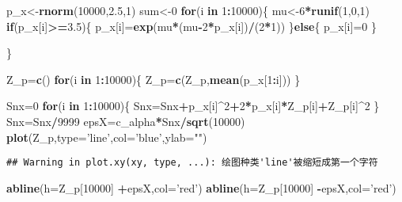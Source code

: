 \documentclass[]{article}
\newenvironment{Shaded}{\begin{snugshade}}{\end{snugshade}}
\newcommand{\KeywordTok}[1]{\textcolor[rgb]{0.13,0.29,0.53}{\textbf{#1}}}
\newcommand{\DataTypeTok}[1]{\textcolor[rgb]{0.13,0.29,0.53}{#1}}
\newcommand{\DecValTok}[1]{\textcolor[rgb]{0.00,0.00,0.81}{#1}}
\newcommand{\FloatTok}[1]{\textcolor[rgb]{0.00,0.00,0.81}{#1}}
\newcommand{\StringTok}[1]{\textcolor[rgb]{0.31,0.60,0.02}{#1}}
\newcommand{\ControlFlowTok}[1]{\textcolor[rgb]{0.13,0.29,0.53}{\textbf{#1}}}
\newcommand{\OperatorTok}[1]{\textcolor[rgb]{0.81,0.36,0.00}{\textbf{#1}}}
\newcommand{\NormalTok}[1]{#1}
\begin{document}
\begin{Shaded}
\begin{Highlighting}[]
\NormalTok{p_x<-}\KeywordTok{rnorm}\NormalTok{(}\DecValTok{10000}\NormalTok{,}\FloatTok{2.5}\NormalTok{,}\DecValTok{1}\NormalTok{)}
\NormalTok{sum<-}\DecValTok{0}
\ControlFlowTok{for}\NormalTok{(i }\ControlFlowTok{in} \DecValTok{1}\OperatorTok{:}\DecValTok{10000}\NormalTok{)\{}
\NormalTok{  mu<-}\DecValTok{6}\OperatorTok{*}\KeywordTok{runif}\NormalTok{(}\DecValTok{1}\NormalTok{,}\DecValTok{0}\NormalTok{,}\DecValTok{1}\NormalTok{)}
  \ControlFlowTok{if}\NormalTok{(p_x[i]}\OperatorTok{>=}\FloatTok{3.5}\NormalTok{)\{}
\NormalTok{  p_x[i]=}\KeywordTok{exp}\NormalTok{(mu}\OperatorTok{*}\NormalTok{(mu}\OperatorTok{-}\DecValTok{2}\OperatorTok{*}\NormalTok{p_x[i])}\OperatorTok{/}\NormalTok{(}\DecValTok{2}\OperatorTok{*}\DecValTok{1}\NormalTok{))}
\NormalTok{  \}}\ControlFlowTok{else}\NormalTok{\{}
\NormalTok{    p_x[i]=}\DecValTok{0}
\NormalTok{  \}}

\NormalTok{\}}

\NormalTok{Z_p=}\KeywordTok{c}\NormalTok{()}
\ControlFlowTok{for}\NormalTok{(i }\ControlFlowTok{in} \DecValTok{1}\OperatorTok{:}\DecValTok{10000}\NormalTok{)\{}
\NormalTok{  Z_p=}\KeywordTok{c}\NormalTok{(Z_p,}\KeywordTok{mean}\NormalTok{(p_x[}\DecValTok{1}\OperatorTok{:}\NormalTok{i]))}
\NormalTok{\}}

\NormalTok{Snx=}\DecValTok{0}  
\ControlFlowTok{for}\NormalTok{(i }\ControlFlowTok{in} \DecValTok{1}\OperatorTok{:}\DecValTok{10000}\NormalTok{)\{}
\NormalTok{  Snx=Snx}\OperatorTok{+}\NormalTok{p_x[i]}\OperatorTok{^}\DecValTok{2}\OperatorTok{+}\DecValTok{2}\OperatorTok{*}\NormalTok{p_x[i]}\OperatorTok{*}\NormalTok{Z_p[i]}\OperatorTok{+}\NormalTok{Z_p[i]}\OperatorTok{^}\DecValTok{2}
\NormalTok{\}}
\NormalTok{Snx=Snx}\OperatorTok{/}\DecValTok{9999}
\NormalTok{epsX=c_alpha}\OperatorTok{*}\NormalTok{Snx}\OperatorTok{/}\KeywordTok{sqrt}\NormalTok{(}\DecValTok{10000}\NormalTok{)}
\KeywordTok{plot}\NormalTok{(Z_p,}\DataTypeTok{type=}\StringTok{'line'}\NormalTok{,}\DataTypeTok{col=}\StringTok{'blue'}\NormalTok{,}\DataTypeTok{ylab=}\StringTok{""}\NormalTok{)}
\end{Highlighting}
\end{Shaded}

\begin{verbatim}
## Warning in plot.xy(xy, type, ...): 绘图种类'line'被缩短成第一个字符
\end{verbatim}

\begin{Shaded}
\begin{Highlighting}[]
\KeywordTok{abline}\NormalTok{(}\DataTypeTok{h=}\NormalTok{Z_p[}\DecValTok{10000}\NormalTok{] }\OperatorTok{+}\NormalTok{epsX,}\DataTypeTok{col=}\StringTok{'red'}\NormalTok{)}
\KeywordTok{abline}\NormalTok{(}\DataTypeTok{h=}\NormalTok{Z_p[}\DecValTok{10000}\NormalTok{] }\OperatorTok{-}\NormalTok{epsX,}\DataTypeTok{col=}\StringTok{'red'}\NormalTok{)}
\end{Highlighting}
\end{Shaded}
\end{document}
